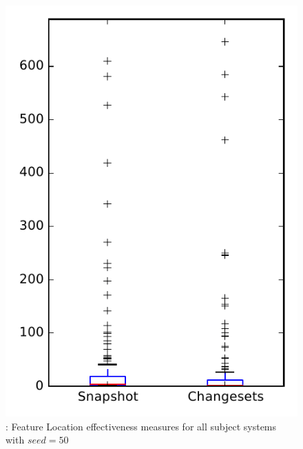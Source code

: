 
\begin{figure}
\centering
\includegraphics[height=0.4\textheight]{figures/flt_seed/rq1_overview_50}
\caption{\rone: Feature Location effectiveness measures for all subject systems with $seed=50$}
\label{fig:flt_seed:rq1:overview}
\end{figure}
